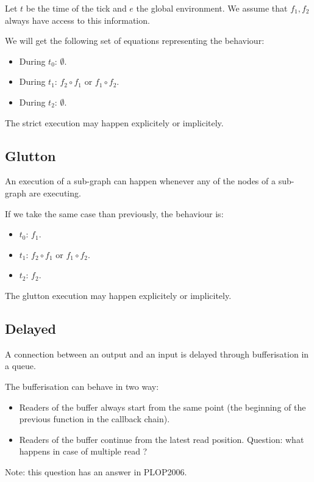 \documentclass{article}
\begin{document}
    Let $t$ be the time of the tick and $e$ the global environment. We assume that $f_1, f_2$ always have access to this information.
    
    We will get the following set of equations representing the behaviour: 
    \begin{itemize}
        \item During $t_0$: $\emptyset$.
        \item During $t_1$: $f_2 \circ f_1 $ or $f_1 \circ f_2$.
        \item During $t_2$: $\emptyset$. 
    \end{itemize}

    The strict execution may happen explicitely or implicitely.
    
	\subsection{Glutton}
	An execution of a sub-graph can happen whenever any of the nodes of a sub-graph are executing. 
    
    If we take the same case than previously, the behaviour is:
    \begin{itemize}
        \item $t_0$: $f_1$.
        \item $t_1$: $f_2 \circ f_1$ or $f_1 \circ f_2$.
        \item $t_2$: $f_2$. 
    \end{itemize}

    The glutton execution may happen explicitely or implicitely.
    
	\subsection{Delayed}
	A connection between an output and an input is delayed through bufferisation in a queue.
	
	The bufferisation can behave in two way:
	\begin{itemize}
		\item Readers of the buffer always start from the same point (the beginning of the previous function in the callback chain).
		\item Readers of the buffer continue from the latest read position.
		Question: what happens in case of multiple read ?
	\end{itemize}
	
    Note: this question has an answer in PLOP2006.
    
\end{document}
